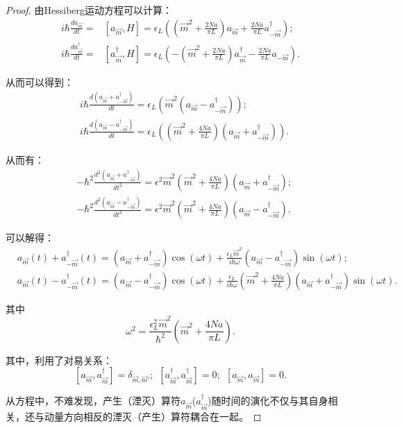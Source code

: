 \documentclass[reqno,a4paper,12pt]{amsart}
\begin{document}
\begin{proof}
由Hessiberg运动方程可以计算：
\begin{align*}
	i\hbar \frac{d a_{\vec{m}}}{dt} =& [a_{\vec{m}}, H] = \epsilon_L \left( (\vec{m}^2+\frac{2Na}{\pi L}) a_{\vec{m}} + \frac{2Na}{\pi L} a_{-\vec{m}}^\dagger \right); \\
	i\hbar \frac{d a_{\vec{m}}^\dagger}{dt} =& [a_{\vec{m}}^\dagger, H] = \epsilon_L \left( -(\vec{m}^2+\frac{2Na}{\pi L})a_{\vec{m}}^\dagger - \frac{2Na}{\pi L} a_{-\vec{m}} \right).
\end{align*}

从而可以得到：
\begin{align*}
	&i\hbar \frac{d(a_{\vec{m}} + a_{-\vec{m}}^\dagger)}{dt} = \epsilon_L \left( \vec{m}^2(a_{\vec{m}} - a_{-\vec{m}}^\dagger) \right); \\
	&i\hbar \frac{d(a_{\vec{m}} - a_{-\vec{m}}^\dagger)}{dt} = \epsilon_L \left( (\vec{m}^2+\frac{4Na}{\pi L}) (a_{\vec{m}}+a_{-\vec{m}}^\dagger) \right).
\end{align*}

从而有：
\begin{align*}
	&-\hbar^2 \frac{d^2(a_{\vec{m}} + a_{-\vec{m}}^\dagger)}{dt^2} = \epsilon^2 \vec{m}^2(\vec{m}^2+\frac{4Na}{\pi L}) (a_{\vec{m}} + a_{-\vec{m}}^\dagger); \\
	&-\hbar^2 \frac{d^2(a_{\vec{m}} - a_{-\vec{m}}^\dagger)}{dt^2} = \epsilon^2 \vec{m}^2(\vec{m}^2+\frac{4Na}{\pi L}) (a_{\vec{m}} - a_{-\vec{m}}^\dagger).
\end{align*}

可以解得：
\begin{align*}
	&a_{\vec{m}}(t) + a_{-\vec{m}}^\dagger(t) = (a_{\vec{m}}+a_{-\vec{m}}^\dagger) \cos(\omega t) + \frac{\epsilon_L \vec{m}^2}{i\hbar \omega} (a_{\vec{m}}-a_{-\vec{m}}^\dagger) \sin(\omega t); \\
	&a_{\vec{m}}(t) - a_{-\vec{m}}^\dagger(t) = (a_{\vec{m}}-a_{-\vec{m}}^\dagger) \cos(\omega t) + \frac{\epsilon_L}{i\hbar \omega}(\vec{m}^2+\frac{4Na}{\pi L}) (a_{\vec{m}}+a_{-\vec{m}}^\dagger) \sin(\omega t).
\end{align*}

其中
\[
	\omega^2 = \frac{\epsilon_L^2 \vec{m}^2}{\hbar^2}(\vec{m}^2 + \frac{4Na}{\pi L}).
\]

其中，利用了对易关系：
\[
	[a_{\vec{m}}, a_{\vec{m}}^\dagger] = \delta_{\vec{m}, \vec{m}'}; \ \ [a_{\vec{m}}^\dagger, a_{\vec{m}}^\dagger] = 0; \ \ [a_{\vec{m}}, a_{\vec{m}}] = 0.
\]

从方程中，不难发现，产生（湮灭）算符$a_{\vec{m}}$($a_{\vec{m}}^\dagger$)随时间的演化不仅与其自身相关，还与动量方向相反的湮灭（产生）算符耦合在一起。
\end{proof}
\end{document}

